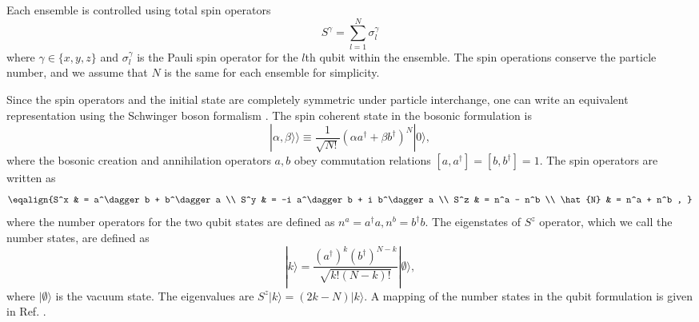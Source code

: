 \documentclass[12pt]{iopart}
\begin{document}
Each ensemble is controlled using total spin operators
%
\begin{equation}
S^\gamma = \sum_{l=1}^N \sigma_l^\gamma
\end{equation}
%
where $\gamma \in\{ x, y, z \} $ and $ \sigma_l^\gamma $ is the Pauli spin operator for the $ l $th qubit within the ensemble.  The spin operations conserve the particle number, and we assume that $ N $ is the same for each ensemble for simplicity. 

Since the spin operators and the initial state are completely symmetric under particle interchange, one can write an equivalent representation using the Schwinger boson formalism \cite{byrnes2020quantum}.  The spin coherent state in the bosonic formulation is 
%
\begin{equation}
\label{becqubit}
|\alpha,\beta\rangle\rangle\equiv\frac{1}{\sqrt{N!}}(\alpha a^\dagger+\beta b^\dagger)^{N}|0\rangle,
\end{equation}
%
where the bosonic creation and annihilation operators $ a, b $ obey commutation relations $[a,a^\dagger]=[b,b^\dagger]=1$. The spin operators are written as
%
\begin{equation}
\eqalign{%
S^x & = a^\dagger b + b^\dagger a \\
S^y & = -i a^\dagger b + i b^\dagger a \\
S^z & = n^a - n^b \\
\hat{N} & = n^a + n^b ,
}
\end{equation}
%
where the number operators for the two qubit states are defined as $ n^a = a^\dagger a, n^b = b^\dagger b $.  The eigenstates of $ S^z $ operator, which we call the number states, are defined as
%
\begin{equation}
| k \rangle = \frac{ (a^\dagger)^k (b^\dagger)^{N-k} }{\sqrt{k! (N-k)!}} | \emptyset \rangle ,
\end{equation}
%
where $ | \emptyset \rangle $ is the vacuum state.  The eigenvalues are $ S^z |k \rangle = (2k - N) | k \rangle $. A mapping of the number states in the qubit formulation is given in Ref. \cite{byrnes2023multipartite}.  


\end{document}
